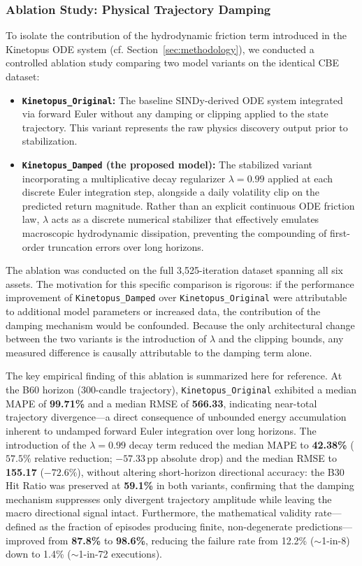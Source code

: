 \documentclass[11pt,a4paper]{article}
\begin{document}
\subsubsection{Ablation Study: Physical Trajectory Damping}
To isolate the contribution of the hydrodynamic friction term introduced in the Kinetopus ODE system (cf. Section~\ref{sec:methodology}), we conducted a controlled ablation study comparing two model variants on the identical CBE dataset:
\begin{itemize}[leftmargin=1.5em]
    \item \textbf{\texttt{Kinetopus\_Original}:} The baseline SINDy-derived ODE system integrated via forward Euler without any damping or clipping applied to the state trajectory. This variant represents the raw physics discovery output prior to stabilization.
    \item \textbf{\texttt{Kinetopus\_Damped} (the proposed model):} The stabilized variant incorporating a multiplicative decay regularizer $\lambda = 0.99$ applied at each discrete Euler integration step, alongside a daily volatility clip on the predicted return magnitude. Rather than an explicit continuous ODE friction law, $\lambda$ acts as a discrete numerical stabilizer that effectively emulates macroscopic hydrodynamic dissipation, preventing the compounding of first-order truncation errors over long horizons.
\end{itemize}

The ablation was conducted on the full 3,525-iteration dataset spanning all six assets. The motivation for this specific comparison is rigorous: if the performance improvement of \texttt{Kinetopus\_Damped} over \texttt{Kinetopus\_Original} were attributable to additional model parameters or increased data, the contribution of the damping mechanism would be confounded. Because the only architectural change between the two variants is the introduction of $\lambda$ and the clipping bounds, any measured difference is causally attributable to the damping term alone.

The key empirical finding of this ablation is summarized here for reference. At the B60 horizon (300-candle trajectory), \texttt{Kinetopus\_Original} exhibited a median MAPE of \textbf{99.71\%} and a median RMSE of \textbf{566.33}, indicating near-total trajectory divergence---a direct consequence of unbounded energy accumulation inherent to undamped forward Euler integration over long horizons. The introduction of the $\lambda = 0.99$ decay term reduced the median MAPE to \textbf{42.38\%} ($57.5\%$ relative reduction; $-57.33\,\text{pp}$ absolute drop) and the median RMSE to \textbf{155.17} ($-72.6\%$), without altering short-horizon directional accuracy: the B30 Hit Ratio was preserved at \textbf{59.1\%} in both variants, confirming that the damping mechanism suppresses only divergent trajectory amplitude while leaving the macro directional signal intact. Furthermore, the mathematical validity rate---defined as the fraction of episodes producing finite, non-degenerate predictions---improved from \textbf{87.8\%} to \textbf{98.6\%}, reducing the failure rate from 12.2\% ($\sim$1-in-8) down to 1.4\% ($\sim$1-in-72 executions).
\end{document}
